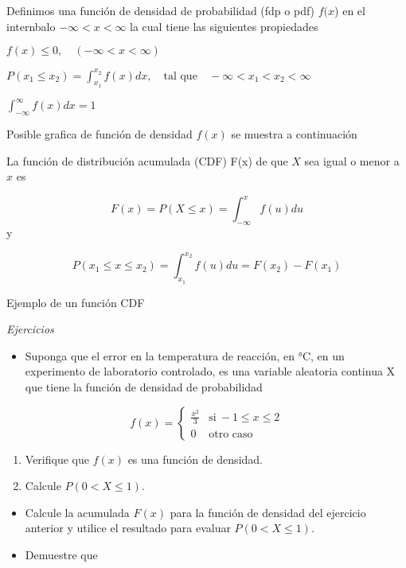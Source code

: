 \documentclass[11pt]{article}
\providecommand{\tightlist}{%
      \setlength{\itemsep}{0pt}\setlength{\parskip}{0pt}}
\begin{document}
Definimos una función de densidad de probabilidad (fdp o pdf) \(f(x\))
en el internbalo \(-\infty < x < \infty\) la cual tiene las siguientes
propiedades

\(f(x)\leq 0, \quad (-\infty < x < \infty)\)

\(P(x_{1}\leq x_{2} ) = \int_{x_{1}}^{x_{2}}f(x)dx , \quad \text{tal que} \quad -\infty < x_{1}< x_{2}< \infty\)

\(\int_{-\infty}^{\infty}f(x)dx=1\)

Posible grafica de función de densidad \(f(x)\) se muestra a
continuación

La función de distribución acumulada (CDF) F(x) de que \(X\) sea igual o
menor a \(x\) es

\[
F(x)= P(X\leq x)= \int_{-\infty}^{x} f(u)du
\] y

\[
P(x_{1}\leq x \leq x_{2})= \int_{x_{1}}^{x_{2}} f(u)du= F(x_{2})-F(x_{1})
\]

Ejemplo de un función CDF

\emph{Ejercicios}

\begin{itemize}
\tightlist
\item
  Suponga que el error en la temperatura de reacción, en °C, en un
  experimento de laboratorio controlado, es una variable aleatoria
  continua X que tiene la función de densidad de probabilidad
\end{itemize}

\begin{equation}
     \label{eq:aqui}
     f(x) = \left\{
           \begin{array}{ll}
             \frac{x^2}{3}    & \mathrm{si\ } -1 \le x \le 2 \\
             0 & \mathrm{\text{otro caso}  } 
           \end{array}
         \right.
   \end{equation}

\begin{enumerate}
\def\labelenumi{\alph{enumi})}
\item
  Verifique que \(f (x)\) es una función de densidad.
\item
  Calcule \(P(0 < X \leq 1)\).
\end{enumerate}

\begin{itemize}
\item
  Calcule la acumulada \(F(x)\) para la función de densidad del
  ejercicio anterior y utilice el resultado para evaluar
  \(P(0 < X \leq 1)\).
\item
  Demuestre que
\end{itemize}
\end{document}
